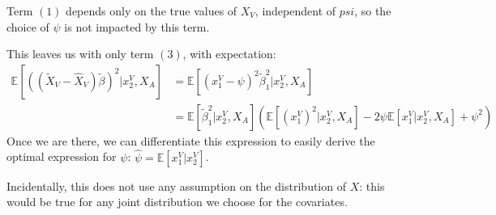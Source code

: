 \documentclass[12pt, a4paper]{article}
\begin{document}
Term $(1)$ depends only on the true values of $X_V$, independent of $psi$, so the choice of $\psi$  is not impacted by this term.

This leaves us with only term $(3)$, with expectation:
\begin{align*}
\mathbb{E}[((\tilde{X}_V-\hat{X}_V)\tilde{\beta})^2 \vert x^V_2, X_A] &= \mathbb{E}[(x_1^V - \psi)^2 \tilde{\beta}_1^2 \vert x^V_2, X_A] \\
													&= \mathbb{E}[\tilde{\beta}_1^2 \vert x^V_2, X_A] (\mathbb{E}[(x_1^V)^2\vert x^V_2, X_A] - 2\psi \mathbb{E}[x_1^V\vert x^V_2, X_A] + \psi^2)
\end{align*}
Once we are there, we can differentiate this expression to easily derive the optimal expression for $\psi$: $\hat{\psi} = \mathbb{E}[x_1^V\vert x^V_2]$.

Incidentally, this does not use any assumption on the distribution of $X$: this would be true for any joint distribution we choose for the covariates.
\end{document}
